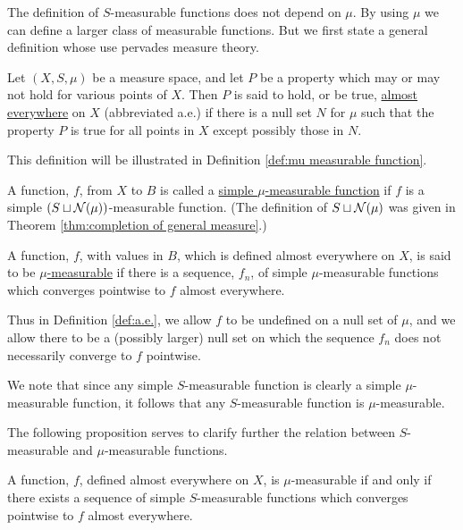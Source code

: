 The definition of $S$-measurable functions does not depend on $\mu$. By using $\mu$ we can define a larger class of measurable functions. But we first state a general definition whose use pervades measure theory.

\begin{definition}
\label{def:a.e.}
Let $(X,S,\mu)$ be a measure space, and let $P$ be a property which may or may not hold for various points of $X$. Then $P$ is said to hold, or be true, \underline{almost everywhere} on $X$ (abbreviated a.e.) if there is a null set $N$ for $\mu$ such that the property $P$ is true for all points in $X$ except possibly those in $N$.
\end{definition}

This definition will be illustrated in Definition \ref{def:mu measurable function}.

\begin{definition}
A function, $f$, from $X$ to $B$ is called a \underline{simple $\mu$-measurable function} if $f$ is a simple $(S\sqcup{\cal N}(\mu))$-measurable function. (The definition of $S\sqcup{\cal N}(\mu)$ was given in Theorem \ref{thm:completion of general measure}.)
\end{definition}

\begin{definition}
\label{def:mu measurable function}
A function, $f$, with values in $B$, which is defined almost everywhere on $X$, is said to be \underline{$\mu$-measurable} if there is a sequence, $f_n$, of simple $\mu$-measurable functions which converges pointwise to $f$ almost everywhere.
\end{definition}

Thus in Definition \ref{def:a.e.}, we allow $f$ to be undefined on a null set of $\mu$, and we allow there to be a (possibly larger) null set on which the sequence $f_n$ does not necessarily converge to $f$ pointwise.

We note that since any simple $S$-measurable function is clearly a simple $\mu$-measurable function, it follows that any $S$-measurable function is $\mu$-measurable.

The following proposition serves to clarify further the relation between $S$-measurable and $\mu$-measurable functions.

\begin{proposition}
A function, $f$, defined almost everywhere on $X$, is $\mu$-measurable if and only if there exists a sequence of simple $S$-measurable functions which converges pointwise to $f$ almost everywhere.
\end{proposition}

